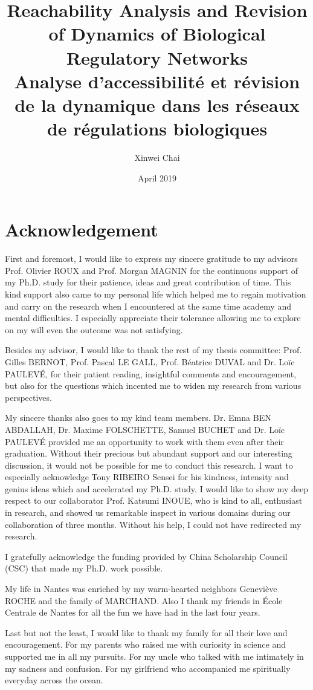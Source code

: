 \documentclass[11pt,twoside,openright]{report}
\title{Reachability Analysis and Revision of Dynamics of Biological Regulatory Networks
\\
\vspace{0.5cm}
\large Analyse d'accessibilit\'e et r\'evision de la dynamique dans les r\'eseaux de r\'egulations biologiques
}
\date{April 2019}
\author{Xinwei Chai}
\theoremstyle{definition}
\begin{document}

\setcounter{page}{1}
\chapter*{Acknowledgement}
First and foremost, I would like to express my sincere gratitude to my advisors Prof. Olivier ROUX and Prof. Morgan MAGNIN for the continuous support of my Ph.D. study for their patience, ideas and great contribution of time.
This kind support also came to my personal life which helped me to regain motivation and carry on the research when I encountered at the same time academy and mental difficulties.
I especially appreciate their tolerance allowing me to explore on my will even the outcome was not satisfying.

Besides my advisor, I would like to thank the rest of my thesis committee: Prof. Gilles BERNOT, Prof. Pascal LE GALL, Prof. B\'eatrice DUVAL and Dr. Lo\"ic PAULEV\'E, for their patient reading, insightful comments and encouragement, but also for the questions which incented me to widen my research from various perspectives.

My sincere thanks also goes to my kind team members.
Dr. Emna BEN ABDALLAH, Dr. Maxime FOLSCHETTE, Samuel BUCHET and Dr. Lo\"ic PAULEV\'E provided me an opportunity to work with them even after their graduation. 
Without their precious but abundant support and our interesting discussion, it would not be possible for me to conduct this research.
I want to especially acknowledge Tony RIBEIRO Sensei for his kindness, intensity and genius ideas which and accelerated my Ph.D. study.
I would like to show my deep respect to our collaborator Prof. Katsumi INOUE, who is kind to all, enthusiast in research, and showed us remarkable inspect in various domains during our collaboration of three months.
Without his help, I could not have redirected my research.

I gratefully acknowledge the funding provided by China Scholarship Council (CSC) that made my Ph.D. work possible.
 
My life in Nantes was enriched by my warm-hearted neighbors Genevi\`eve ROCHE and the family of MARCHAND.
Also I thank my friends in \'Ecole Centrale de Nantes for all the fun we have had in the last four years.

Last but not the least, I would like to thank my family for all their love and encouragement. 
For my parents who raised me with curiosity in science and supported me in all my pursuits.
For my uncle who talked with me intimately in my sadness and confusion.
For my girlfriend who accompanied me spiritually everyday across the ocean.
\end{document}
